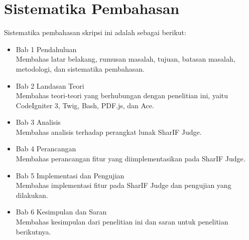 \section{Sistematika Pembahasan}
\label{sec:sispem}
Sistematika pembahasan skripsi ini adalah sebagai berikut:
\begin{itemize}
	\item Bab 1 Pendahuluan \\ Membahas latar belakang, rumusan masalah, tujuan, batasan masalah, metodologi, dan sistematika pembahasan.
	\item Bab 2 Landasan Teori \\ Membahas teori-teori yang berhubungan dengan penelitian ini, yaitu CodeIgniter 3, Twig, Bash, PDF.js, dan Ace.
	\item Bab 3 Analisis \\ Membahas analisis terhadap perangkat lunak SharIF Judge.
	\item Bab 4 Perancangan \\ Membahas perancangan fitur yang diimplementasikan pada SharIF Judge.
	\item Bab 5 Implementasi dan Pengujian \\ Membahas implementasi fitur pada SharIF Judge dan pengujian yang dilakukan.
	\item Bab 6 Kesimpulan dan Saran \\ Membahas kesimpulan dari penelitian ini dan saran untuk penelitian berikutnya.
\end{itemize}

